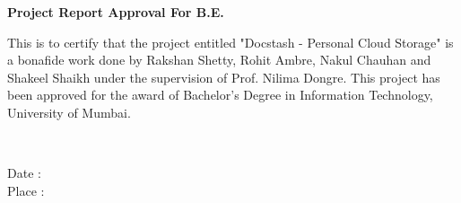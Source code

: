 
\newpage
\begin{center}
\textbf{\Large Project Report Approval For B.E.}
\end{center}
\vspace{0.5in}

This is to certify that the project entitled "Docstash - Personal Cloud Storage" is a bonafide work done by Rakshan Shetty, Rohit Ambre, Nakul Chauhan and Shakeel Shaikh under the supervision of Prof. Nilima Dongre. This project has been approved for the award of Bachelor’s Degree in Information Technology, University of Mumbai.

\\\vspace{1in}
\begin{flushleft}
Date  :\\
Place :
\end{flushleft}
